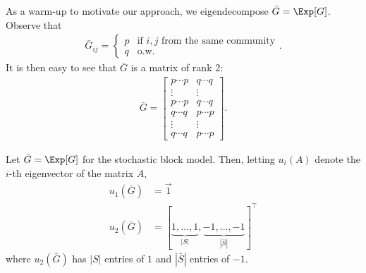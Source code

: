 As a warm-up to motivate our approach, we eigendecompose $\bar{G} = \Exp[G]$. Observe that
\begin{align}
    \bar{G}_{ij} = \begin{cases}
        p &\text{if $i,j$ from the same community} \\
        q &\text{o.w.} \end{cases}.
\end{align}
It is then easy to see that $\bar{G}$ is a matrix of rank $2$:
\begin{align}
    \bar{G} = \left[
        \begin{array}{c|c}
        p \cdots p & q \cdots q \\
        \vdots & \vdots \\
        p \cdots p & q \cdots q\\
        \hline
        q \cdots q & p \cdots p \\
        \vdots & \vdots \\
        q \cdots q & p \cdots p 
        \end{array}
        \right].
\end{align}
\begin{lemma} \label{lec19:lma:sbm_eigen}
Let $\bar{G} = \Exp[G]$ for the stochastic block model. Then, letting $u_i(A)$ denote the $i$-th eigenvector of the matrix $A$,
\begin{align}
    u_1(\bar{G}) &= \vec{1} \label{lec19:eqn:top_eig_G}\\
    u_2(\bar{G}) &= [\underbrace{1, \dots, 1}_{|S|}, \underbrace{-1, \dots, -1}_{|\bar{S}|}]^\top \label{lec19:eqn:second_eig_G}
\end{align}
where $u_2(\bar{G})$ has $|S|$ entries of $1$ and $|\bar{S}|$ entries of $-1$.
\end{lemma}

